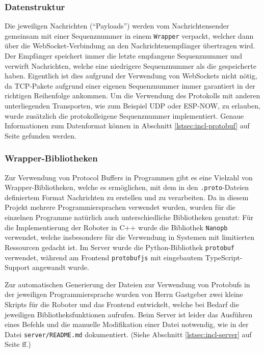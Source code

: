 \subsubsection{Datenstruktur}
Die jeweiligen Nachrichten (``Payloads'')
werden vom Nachrichtensender gemeinsam mit einer Sequenznummer in einem \texttt{Wrapper} verpackt,
welcher dann über die WebSocket-Verbindung an den Nachrichtenempfänger übertragen wird.
%
Der Empfänger speichert immer die letzte empfangene Sequenznummer
und verwirft Nachrichten,
welche eine niedrigere Sequenznummer als die gespeicherte haben.
%
Eigentlich ist dies aufgrund der Verwendung von WebSockets nicht nötig,
da TCP-Pakete aufgrund einer eigenen Sequenznummer immer garantiert in der richtigen Reihenfolge ankommen.
%
Um die Verwendung des Protokolls mit anderen unterliegenden Transporten,
wie zum Beispiel UDP oder ESP-NOW,
zu erlauben,
wurde zusätzlich die protokolleigene Sequenznummer implementiert.
%
Genaue Informationen zum Datenformat können in Abschnitt
\ref{lstsec:incl-protobuf} auf Seite
\pageref{lstsec:incl-protobuf} gefunden werden.

\subsubsection{Wrapper-Bibliotheken}
Zur Verwendung von Protocol Buffers in Programmen gibt es eine Vielzahl von Wrapper-Bibliotheken,
welche es ermöglichen,
mit dem in den \texttt{.proto}-Dateien definiertem Format
Nachrichten zu erstellen und zu verarbeiten.
%
Da in diesem Projekt mehrere Programmiersprachen verwendet wurden,
wurden für die einzelnen Programme natürlich auch unterschiedliche Bibliotheken genutzt:
%
Für die Implementierung der Roboter in C++ wurde die Bibliothek \texttt{Nanopb} verwendet,
welche insbesondere für die Verwendung in Systemen mit limitierten Ressourcen gedacht ist.
%
Im Server wurde die Python-Bibliothek \texttt{protobuf} verwendet,
während am Frontend \texttt{protobufjs} mit eingebautem TypeScript-Support angewandt wurde.

Zur automatischen Generierung der Dateien zur Verwendung von Protobufs in der jeweiligen Programmiersprache
wurden von Herrn Gastgeber zwei kleine Skripts für die Roboter und das Frontend entwickelt,
welche bei Bedarf die jeweiligen Bibliotheksfunktionen aufrufen.
%
Beim Server ist leider das Ausführen eines Befehls und die manuelle Modifikation einer Datei notwendig,
wie in der Datei \texttt{server/README.md} dokumentiert. (Siehe Abschnitt \ref{lstsec:incl-server} auf Seite \pageref{lstsec:incl-server} ff.) 

